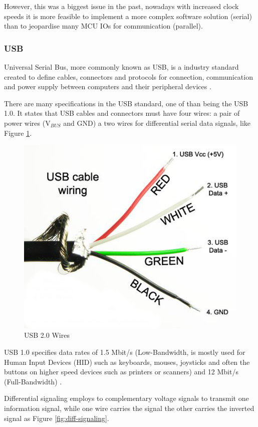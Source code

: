 	However, this was a biggest issue in the past, nowadays with increased clock speeds it is more feasible to implement a more complex software solution (serial) than to jeopardise many MCU IOs for communication (parallel).


\subsubsection{USB}\label{sssec:usb}
	Universal Serial Bus, more commonly known as USB, is a industry standard created to define cables, connectors and protocols for connection, communication and power supply between computers and their peripheral devices \cite{garfinkel1995usb}.
	\par
	There are many specifications in the USB standard, one of than being the USB 1.0. It states that USB cables and connectors must have four wires: a pair of power wires (V$_{BUS}$ and GND) a two wires for differential serial data signals, like Figure \ref{fig:usb2.0-wires}.
	

		\begin{figure}[htbp]
			\centering
				\includegraphics[scale=0.5]{figuras/fig-usb2-0-wires}
			\caption{USB 2.0 Wires \cite{usb2.0-wires}}
			\label{fig:usb2.0-wires}
		\end{figure}

	USB 1.0 specifies data rates of 1.5 Mbit/s (Low-Bandwidth, is mostly used for Human Input Devices (HID) such as keyboards, mouses, joysticks and often the buttons on higher speed devices such as printers or scanners) and 12 Mbit/s (Full-Bandwidth) \cite{specification91}.
	\par
	Differential signaling employs to complementary voltage signals to transmit one information signal, while one wire carries the signal the other carries the inverted signal \cite{diffkinnaird} as Figure \ref{fig:diff-signaling}.

